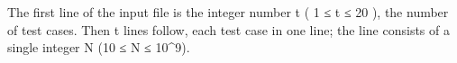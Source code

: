 The first line of the input file is the integer number t ( 1 ≤ t ≤ 20 ), the number of test cases. Then t lines follow, each test case in one line; the line consists of a single integer N (10 ≤ N ≤ 10\textasciicircum9).